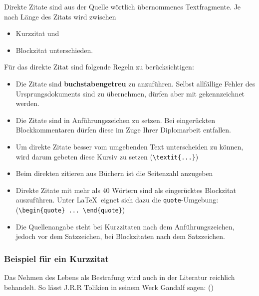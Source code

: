 \renewcommand*{\authorOfNextLines}{Helmut Quinz}
Direkte Zitate sind aus der Quelle wörtlich übernommenes Textfragmente.
Je nach Länge des Zitats wird zwischen
\begin{itemize}
	\item Kurzzitat und
	\item Blockzitat unterschieden.
\end{itemize} 
Für das direkte Zitat sind folgende Regeln zu berücksichtigen:
\begin{itemize}
	\item Die Zitate sind \textbf{buchstabengetreu} zu anzuführen. 
		Selbst allfällige Fehler des Ursprungsdokuments sind zu übernehmen, dürfen aber mit  gekennzeichnet werden.
	\item Die Zitate sind in Anführungszeichen zu setzen. 
		Bei eingerückten Blockkommentaren dürfen diese im Zuge Ihrer Diplomarbeit entfallen.
	\item Um direkte Zitate besser vom umgebenden Text unterscheiden zu können, wird darum gebeten diese Kursiv zu setzen (\verb|\textit{...}|)
	\item Beim direkten zitieren aus Büchern ist die Seitenzahl anzugeben
	\item Direkte Zitate mit mehr als 40 Wörtern sind als eingerücktes Blockzitat auszuführen.
		Unter \LaTeX ~eignet sich dazu die \texttt{quote}-Umgebung:\newline
		 (\verb|\begin{quote} ... \end{quote}|)
	\item Die Quellenangabe steht bei Kurzzitaten nach dem Anführungszeichen, jedoch vor dem Satzzeichen, bei Blockzitaten nach dem Satzzeichen.
			
\end{itemize}

\subsubsection{Beispiel für ein Kurzzitat}
Das Nehmen des Lebens als Bestrafung wird auch in der Literatur reichlich behandelt.
So lässt J.R.R Tolikien in seinem Werk  Gandalf sagen: 
 (\cite[Seite 74]{Tolkien1954})
